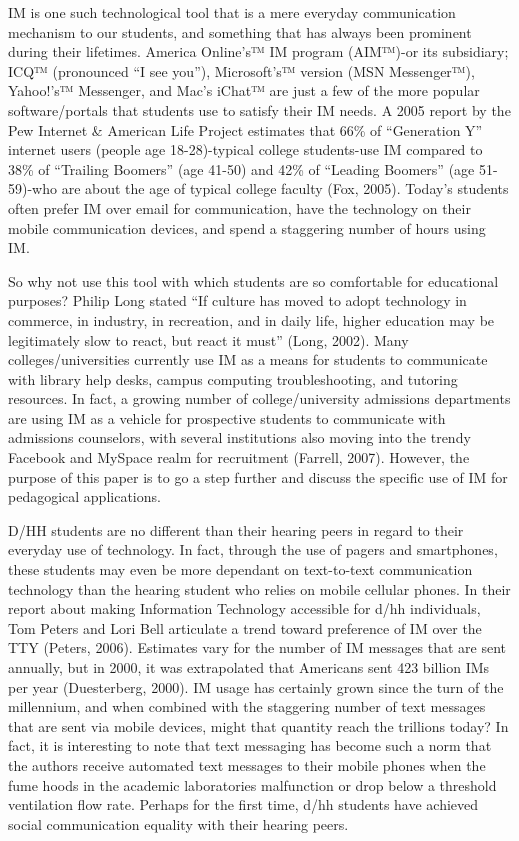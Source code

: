 \documentclass[11.5pt]{sig-alternate} %
\begin{document}
\begin{large}
IM is one such technological tool that is a mere everyday communication mechanism to our students, and something that has always been prominent during their lifetimes. America Online’s™ IM program (AIM™)-or its subsidiary; ICQ™ (pronounced “I see you”), Microsoft’s™ version (MSN Messenger™), Yahoo!’s™ Messenger, and Mac’s iChat™ are just a few of the more popular software/portals that students use to satisfy their IM needs. A 2005 report by the Pew Internet \& American Life Project estimates that 66\% of “Generation Y” internet users (people age 18-28)-typical college students-use IM compared to 38\% of “Trailing Boomers” (age 41-50) and 42\% of “Leading Boomers” (age 51-59)-who are about the age of typical college faculty (Fox, 2005). Today’s students often prefer IM over email for communication, have the technology on their mobile communication devices, and spend a staggering number of hours using IM. 

So why not use this tool with which students are so comfortable for educational purposes? Philip Long stated “If culture has moved to adopt technology in commerce, in industry, in recreation, and in daily life, higher education may be legitimately slow to react, but react it must” (Long, 2002). Many colleges/universities currently use IM as a means for students to communicate with library help desks, campus computing troubleshooting, and tutoring resources. In fact, a growing number of college/university admissions departments are using IM as a vehicle for prospective students to communicate with admissions counselors, with several institutions also moving into the trendy Facebook and MySpace realm for recruitment (Farrell, 2007). However, the purpose of this paper is to go a step further and discuss the specific use of IM for pedagogical applications. 

D/HH students are no different than their hearing peers in regard to their everyday use of technology. In fact, through the use of pagers and smartphones, these students may even be more dependant on text-to-text communication technology than the hearing student who relies on mobile cellular phones. In their report about making Information Technology accessible for d/hh individuals, Tom Peters and Lori Bell articulate a trend toward preference of IM over the TTY (Peters, 2006). Estimates vary for the number of IM messages that are sent annually, but in 2000, it was extrapolated that Americans sent 423 billion IMs per year (Duesterberg, 2000). IM usage has certainly grown since the turn of the millennium, and when combined with the staggering number of text messages that are sent via mobile devices, might that quantity reach the trillions today? In fact, it is interesting to note that text messaging has become such a norm that the authors receive automated text messages to their mobile phones when the fume hoods in the academic laboratories malfunction or drop below a threshold ventilation flow rate. Perhaps for the first time, d/hh students have achieved social communication equality with their hearing peers. 


\end{large}
\end{document}
